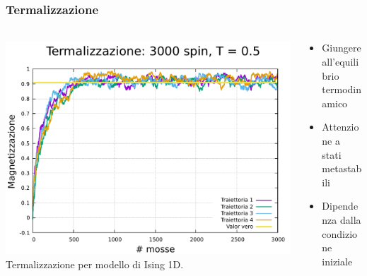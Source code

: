 \begin{frame}
    \frametitle{Termalizzazione}
    \framesubtitle{}

    \begin{columns}

        \begin{column}{0.6\textwidth}

            \centering
            \includegraphics[width=\textwidth]{Immagini/metodiNumerici/term_3000_0.5.pdf}
            \newline
            {\scriptsize Termalizzazione per modello di Ising 1D.}

        \end{column}


        \begin{column}{0.4\textwidth}
            
            \begin{itemize}[itemsep=0.5em, label=$\diamond$]
                \item Giungere all'equilibrio termodinamico
                \item Attenzione a stati metastabili
                \item Dipendenza dalla condizione iniziale
            \end{itemize}
            
        \end{column}
      \end{columns}
  
\end{frame}




